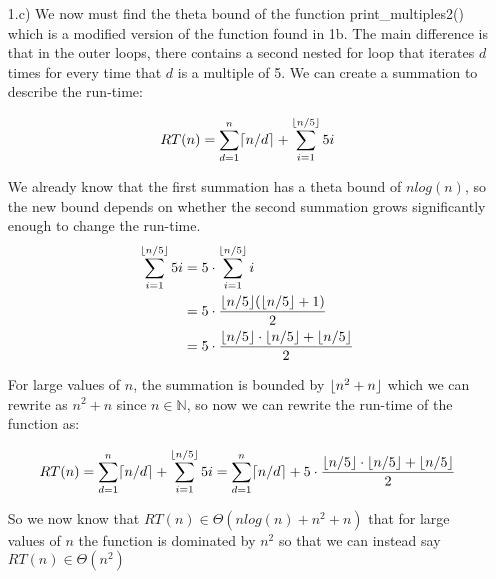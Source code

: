 \documentclass[20pt]{article}
\DeclarePairedDelimiter{\ceil}{\lceil}{\rceil}
\DeclarePairedDelimiter\floor{\lfloor}{\rfloor}
\begin{document}
\begin{enumerate}
    \item[1.c)] We now must find the theta bound of the function print\_multiples2() which is a modified version of the function found in 1b. The main difference is that in the outer loops, there contains a second nested for loop that iterates $d$ times for every time that $d$ is a multiple of 5. We can create a summation to describe the run-time:
    
    \begin{align}
        RT(n) = \sum_{d = 1}^{n}\ceil{n/d} + \sum_{i = 1}^{\floor{n/5}}5i\nonumber
    \end{align}

    We already know that the first summation has a theta bound of $nlog(n)$, so the new bound depends on whether the second summation grows significantly enough to change the run-time.
    \begin{align}
        \sum_{i = 1}^{\floor{n/5}}5i &= 5\cdot\sum_{i = 1}^{\floor{n/5}}i\nonumber\\
        &= 5\cdot \frac{\floor{n/5}(\floor{n/5} + 1)}{2}\nonumber\\
        &= 5\cdot \frac{\floor{n/5}\cdot\floor{n/5} + \floor{n/5}}{2}\nonumber
    \end{align}
    
    For large values of $n$, the summation is bounded by $\floor{n^2 + n}$ which we can rewrite as $n^2 + n$ since $n\in\mathbb{N}$, so now we can rewrite the run-time of the function as:
    
    \begin{align}
        RT(n) = \sum_{d = 1}^{n}\ceil{n/d} + \sum_{i = 1}^{\floor{n/5}}5i\nonumber = \sum_{d = 1}^{n}\ceil{n/d} + 5\cdot \frac{\floor{n/5}\cdot\floor{n/5} + \floor{n/5}}{2}
    \end{align}
    
    So we now know that $RT(n) \in \Theta(nlog(n) + n^2 + n)$ that for large values of $n$ the function is dominated by $n^2$ so that we can instead say $RT(n) \in \Theta(n^2)$ \hfill \Box
    
    
    
\end{enumerate}

\newpage
\end{document}

